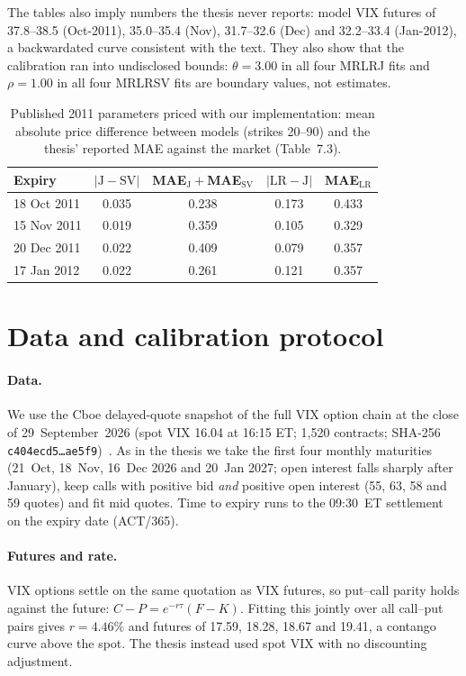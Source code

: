 \documentclass[10pt,twocolumn]{article}
\begin{document}
The tables also imply numbers the thesis never reports: model VIX futures of
37.8--38.5 (Oct-2011), 35.0--35.4 (Nov), 31.7--32.6 (Dec) and 32.2--33.4 (Jan-2012),
a backwardated curve consistent with the text. They also show that the calibration
ran into undisclosed bounds: $\theta=3.00$ in all four MRLRJ fits and $\rho=1.00$ in
all four MRLRSV fits are boundary values, not estimates.

\begin{table}[t]
\centering\small
\caption{Published 2011 parameters priced with our implementation: mean absolute
price difference between models (strikes 20--90) and the thesis' reported MAE
against the market (Table~7.3).}
\label{tab:2011}
\footnotesize\setlength{\tabcolsep}{3pt}
\begin{tabular}{@{}lcccc@{}}
\toprule
Expiry & $|\mathrm{J}-\mathrm{SV}|$ & MAE$_\mathrm{J}{+}$MAE$_\mathrm{SV}$ & $|\mathrm{LR}-\mathrm{J}|$ & MAE$_\mathrm{LR}$\\
\midrule
18 Oct 2011 & 0.035 & 0.238 & 0.173 & 0.433\\
15 Nov 2011 & 0.019 & 0.359 & 0.105 & 0.329\\
20 Dec 2011 & 0.022 & 0.409 & 0.079 & 0.357\\
17 Jan 2012 & 0.022 & 0.261 & 0.121 & 0.357\\
\bottomrule
\end{tabular}
\end{table}

\section{Data and calibration protocol}
\label{sec:protocol}
\paragraph{Data.} We use the Cboe delayed-quote snapshot of the full VIX option chain
at the close of 29~September~2026 (spot VIX 16.04 at 16:15 ET; 1{,}520 contracts;
SHA-256 \texttt{c404ecd5\ldots ae5f9})~\citep{cboe}. As in the thesis we take the first
four monthly maturities (21~Oct, 18~Nov, 16~Dec 2026 and 20~Jan 2027; open interest
falls sharply after January), keep calls with positive bid \emph{and} positive open
interest (55, 63, 58 and 59 quotes) and fit mid quotes. Time to expiry runs to the
09:30~ET settlement on the expiry date (ACT/365).

\paragraph{Futures and rate.} VIX options settle on the same quotation as VIX
futures, so put--call parity holds against the future:
$C-P=e^{-r\tau}(F-K)$. Fitting this jointly over all call--put pairs gives
$r=4.46\%$ and futures of 17.59, 18.28, 18.67 and 19.41, a contango curve
above the spot. The thesis instead used spot VIX with no discounting adjustment.
\end{document}
